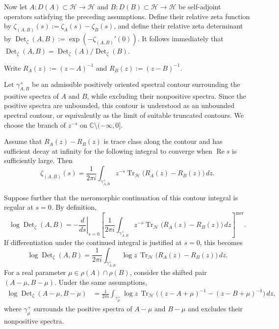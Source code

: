 \documentclass[12pt]{amsart}
\theoremstyle{plain}
\theoremstyle{definition}
\theoremstyle{remark}
\numberwithin{equation}{section} \numberwithin{figure}{section}
\renewcommand*{\to}{\rightarrow}
\begin{document}
Now let \(A:D(A)\subset\mathcal H\to\mathcal H\) and
\(B:D(B)\subset\mathcal H\to\mathcal H\) be self-adjoint operators
satisfying the preceding assumptions. Define their relative zeta
function by
\(\zeta_{(A,B)}(s):=\zeta_A(s)-\zeta_B(s)\), and define their
relative zeta determinant by
\(\operatorname{Det}_{\zeta}(A,B)
:=\exp(-\zeta_{(A,B)}'(0))\).
It follows immediately that
\(\operatorname{Det}_{\zeta}(A,B)
=\operatorname{Det}_{\zeta}(A)/
\operatorname{Det}_{\zeta}(B)\).

Write \(R_A(z):=(z-A)^{-1}\) and \(R_B(z):=(z-B)^{-1}\).

Let \(\gamma_{A,B}^+\) be an admissible positively oriented spectral
contour surrounding the positive spectra of \(A\) and \(B\), while
excluding their nonpositive spectra. Since the positive spectra are
unbounded, this contour is understood as an unbounded spectral
contour, or equivalently as the limit of suitable truncated
contours. We choose the branch of \(z^{-s}\) on
\(\mathbb C\setminus(-\infty,0]\).

Assume that \(R_A(z)-R_B(z)\) is trace class along the contour and
has sufficient decay at infinity for the following integral to
converge when \(\operatorname{Re}s\) is sufficiently large. Then
\[
\zeta_{(A,B)}(s)
=
\frac{1}{2\pi i}
\int_{\gamma_{A,B}^+}
z^{-s}
\operatorname{Tr}_{\mathcal H}
\bigl(R_A(z)-R_B(z)\bigr)\,dz.
\]

Suppose further that the meromorphic continuation of this contour
integral is regular at \(s=0\). By definition,
\[
\log\operatorname{Det}_{\zeta}(A,B)
=
-\left.
\frac{d}{ds}
\right|_{s=0}
\left[
\frac{1}{2\pi i}
\int_{\gamma_{A,B}^+}
z^{-s}
\operatorname{Tr}_{\mathcal H}
\bigl(R_A(z)-R_B(z)\bigr)\,dz
\right]^{\mathrm{mer}}.
\]
If differentiation under the continued integral is justified at
\(s=0\), this becomes
\[
\log\operatorname{Det}_{\zeta}(A,B)
=
\frac{1}{2\pi i}
\int_{\gamma_{A,B}^+}
\log z\,
\operatorname{Tr}_{\mathcal H}
\bigl(R_A(z)-R_B(z)\bigr)\,dz.
\]
For a real parameter
\(\mu\in\rho(A)\cap\rho(B)\), consider the shifted pair
\((A-\mu,B-\mu)\). Under the same assumptions,
\[
\begin{aligned}
\log\operatorname{Det}_{\zeta}(A-\mu,B-\mu)
&=
\frac{1}{2\pi i}
\int_{\gamma_\mu^+}
\log z\,
\operatorname{Tr}_{\mathcal H}\bigl(
(z-A+\mu)^{-1}-(z-B+\mu)^{-1}
\bigr)\,dz,
\end{aligned}
\]
where \(\gamma_\mu^+\) surrounds the positive spectra of
\(A-\mu\) and \(B-\mu\) and excludes their nonpositive spectra.
\end{document}
